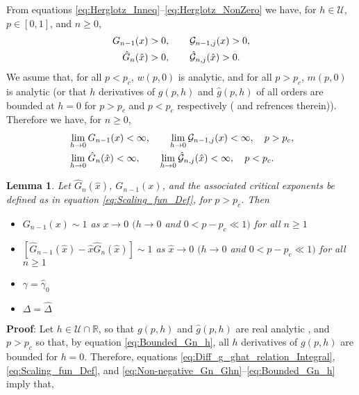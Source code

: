 \documentclass[english,12pt]{ttuthes}
\newtheorem{lemma}{Lemma}[chapter]
\newcommand{\gh}{\hat{\gamma}}
\newcommand{\Dh}{\hat{\Delta}}
\newcommand{\xh}{\hat{x}}
\begin{document}
From equations \eqref{eq:Herglotz_Inneq}--\eqref{eq:Herglotz_NonZero}
we have, for $h\in\mathcal{U}$, $p\in[0,1]$, and $n\geq0$,
%
\begin{align}\label{eq:Non-negative_Gn_Ghn}
   G_{n-1}(x)&>0, \qquad
  \mathcal{G}_{n-1,j}(x)>0,\\
%
  \hat{G}_n(\xh)&>0, \qquad
  \hat{\mathcal{G}}_{n,j}(\xh)>0. \notag
\end{align}
%
We asume that, for all $p<p_c$, $w(p,0)$ is analytic, and for all
$p>p_c$, $m(p,0)$ is analytic (or that $h$ derivatives of $g(p,h)$ and
$\hat{g}(p,h)$ of all orders are bounded at $h=0$ for $p>p_c$ and
$p<p_c$ respectively
(\cite{Golden:CMP-473,Golden:CMP-467,Golden:SIAM89} and refrences 
therein)). Therefore we have, for $n\geq0$,   
% 
\begin{align}\label{eq:Bounded_Gn_h}
  &\lim_{h\to0}G_{n-1}(x)<\infty, \qquad
  \lim_{h\to0}\mathcal{G}_{n-1,j}(x)<\infty,  \quad
  p>p_c,\\
%
  &\lim_{h\to0}\hat{G}_n(\xh)<\infty, \qquad
  \lim_{h\to0}\hat{\mathcal{G}}_{n,j}(\xh)<\infty,  \quad
  p<p_c. \notag
\end{align}
%
 \begin{lemma}\label{lem:asymp_Scaling_funs_x_to_0_p>pc}
   Let $\hat{G}_n(\xh)$, $G_{n-1}(x)$, and the associated critical
   exponents be defined as in equation \eqref{eq:Scaling_fun_Def}, for
   $p>p_c$. Then  
     \begin{itemize}
    \item[1)] $G_{n-1}(x)\sim1$ as $x\to0$ $(h\to0$ and $0<p-p_c\ll1)$ for all $n\geq1$
    \item[2)] $[\hat{G}_{n-1}(\xh)-\xh\hat{G}_n(\xh)]\sim1
      $ as $\xh\to0$ $(h\to0$ 
      and $0<p-p_c\ll1)$ for all $n\geq1$  
    \item[3)] $\gamma=\gh_0$  
    \item[4)] $\Delta=\Dh$    
     \end{itemize}
 \end{lemma}
%
\noindent \textbf{Proof}:
%
Let $h\in\mathcal{U}\cap\mathbb{R}$, so that $g(p,h)$ and $\hat{g}(p,h)$ are
real analytic \cite{Golden:CMP-473}, and $p>p_c$ so that, by equation
\eqref{eq:Bounded_Gn_h}, all $h$ derivatives of $g(p,h)$ are bounded
for $h=0$. Therefore, equations
\eqref{eq:Diff_g_ghat_relation_Integral},    
\eqref{eq:Scaling_fun_Def}, and
\eqref{eq:Non-negative_Gn_Ghn}--\eqref{eq:Bounded_Gn_h} imply that,
\end{document}
